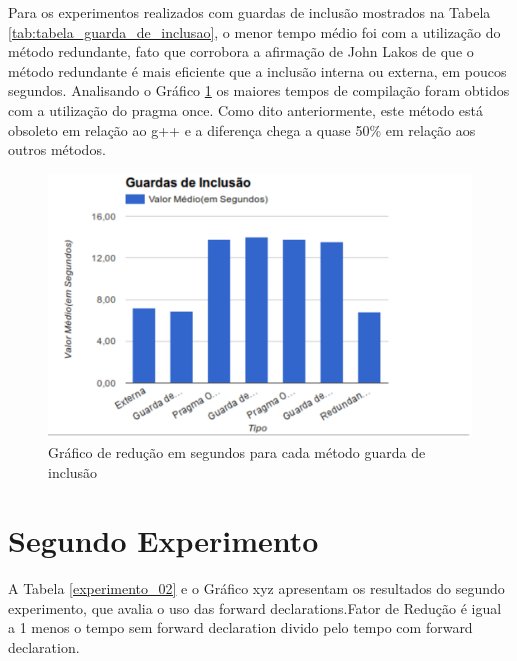 Para os experimentos realizados com guardas de inclusão mostrados na 
Tabela \ref{tab:tabela_guarda_de_inclusao}, o menor tempo médio foi
 com a utilização do método redundante, fato  que corrobora a afirmação
 de John Lakos de que o método redundante é mais eficiente que a inclusão
 interna ou externa, em poucos segundos. Analisando o Gráfico 
\ref{grafico_guardas_de_inclusao} os maiores tempos de compilação foram 
 obtidos com a utilização do pragma once. Como dito anteriormente, este 
método está obsoleto em relação ao g++ e a diferença chega a quase 50\%
 em relação aos outros métodos.

\begin{figure}[h]
    \centering
        \includegraphics[keepaspectratio=true,scale=1]{figuras/guardas_de_inclusao.eps}
    \caption{Gráfico de redução em segundos para cada método guarda de inclusão}
    \label{grafico_guardas_de_inclusao}
\end{figure}


\section{Segundo Experimento}


A Tabela \ref{experimento_02} e o Gráfico xyz apresentam os resultados do
 segundo experimento, que avalia o uso das forward declarations.Fator de
 Redução é igual a 1 menos o tempo sem forward declaration divido pelo
 tempo com forward declaration.



